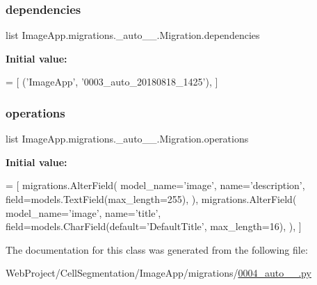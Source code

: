 \subsubsection{\texorpdfstring{dependencies}{dependencies}}
{\footnotesize\ttfamily list Image\+App.\+migrations.\+\_\+auto\+\_\+\_.\+Migration.\+dependencies\hspace{0.3cm}{\ttfamily [static]}}

{\bfseries Initial value\+:}
\begin{DoxyCode}
=  [
        (\textcolor{stringliteral}{'ImageApp'}, \textcolor{stringliteral}{'0003\_auto\_20180818\_1425'}),
    ]
\end{DoxyCode}
\mbox{\label{class_image_app_1_1migrations_1_10004__auto__20180819__1722_1_1_migration_ab2af20850457c5864ba5ea409e91d9e1}} 
\subsubsection{\texorpdfstring{operations}{operations}}
{\footnotesize\ttfamily list Image\+App.\+migrations.\+\_\+auto\+\_\+\_.\+Migration.\+operations\hspace{0.3cm}{\ttfamily [static]}}

{\bfseries Initial value\+:}
\begin{DoxyCode}
=  [
        migrations.AlterField(
            model\_name=\textcolor{stringliteral}{'image'},
            name=\textcolor{stringliteral}{'description'},
            field=models.TextField(max\_length=255),
        ),
        migrations.AlterField(
            model\_name=\textcolor{stringliteral}{'image'},
            name=\textcolor{stringliteral}{'title'},
            field=models.CharField(default=\textcolor{stringliteral}{'DefaultTitle'}, max\_length=16),
        ),
    ]
\end{DoxyCode}


The documentation for this class was generated from the following file\+:\begin{DoxyCompactItemize}
\item 
Web\+Project/\+Cell\+Segmentation/\+Image\+App/migrations/\mbox{\hyperlink{0004__auto__20180819__1722_8py}{0004\+\_\+auto\+\_\+\_.\+py}}\end{DoxyCompactItemize}
